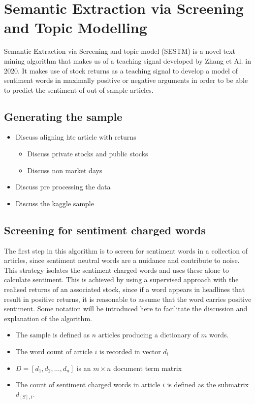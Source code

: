 \documentclass[ oneside,%
                    author={Joshua Felmeden},
                    degree={MEng},
                     title={Semantic Analysis of Financial Headlines Based on Realised Stock Returns},
                  subtitle={}]{dissertation}
\begin{document}
\section{Semantic Extraction via Screening and Topic Modelling}
Semantic Extraction via Screening and topic model (SESTM) is a novel text mining algorithm that makes us of a teaching signal developed by Zhang et Al. in 2020. It makes use of stock returns as a teaching signal to develop a model of sentiment words in maximally positive or negative arguments in order to be able to predict the sentiment of out of sample articles.

\subsection{Generating the sample}
\begin{itemize}
      \item Discuss aligning hte article with returns
      \begin{itemize}
            \item Discuss private stocks and public stocks
            \item Discuss non market days
      \end{itemize}
      \item Discuss pre processing the data
      \item Discuss the kaggle sample
\end{itemize}


\subsection{Screening for sentiment charged words}
The first step in this algorithm is to screen for sentiment words in a collection of articles, since sentiment neutral words are a nuidance and contribute to noise. This strategy isolates the sentiment charged words and uses these alone to calculate sentiment. This is achieved by using a supervised approach with the realised returns of an associated stock, since if a word appears in headlines that result in positive returns, it is reasonable to assume that the word carries positive sentiment. Some notation will be introduced here to facilitate the discussion and explanation of the algorithm.
\begin{itemize}
      \item The sample is defined as $n$ articles producing a dictionary of $m$ words.
      \item The word count of article $i$ is recorded in vector $d_i$
      \item $D = [d_1, d_2, \dots, d_n]$ is an $m \times n$ document term matrix
      \item The count of sentiment charged words in article $i$ is defined as the submatrix $d_{[S],i}$.
\end{itemize}
\end{document}

